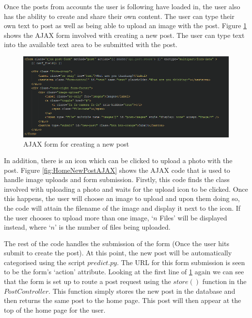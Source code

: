 Once the posts from accounts the user is following have loaded in, the user also has the ability to create and share their own content. The user can type their own text to post as well as being able to upload an image with the post. Figure \ref{fig:HomeNewPostForm} shows the AJAX form involved with creating a new post. The user can type text into the available text area to be submitted with the post.

\begin{figure}[H]
\centering
\includegraphics[width=\textwidth]{Images/Implementation/HomeNewPostForm}
\caption{AJAX form for creating a new post}
\label{fig:HomeNewPostForm}
\end{figure}

In addition, there is an icon which can be clicked to upload a photo with the post. Figure \ref{fig:HomeNewPostAJAX} shows the AJAX code that is used to handle image uploads and form submission. Firstly, this code finds the class involved with uploading a photo and waits for the upload icon to be clicked. Once this happens, the user will choose an image to upload and upon them doing so, the code will attain the filename of the image and display it next to the icon. If the user chooses to upload more than one image, `$n$ Files' will be displayed instead, where `$n$' is the number of files being uploaded.

The rest of the code handles the submission of the form (Once the user hits submit to create the post). At this point, the new post will be automatically categorised using the script $predict.py$. The URL for this form submission is seen to be the form's `action' attribute. Looking at the first line of \ref{fig:HomeNewPostForm} again we can see that the form is set up to route a post request using the $store()$ function in the $PostController$. This function simply stores the new post in the database and then returns the same post to the home page. This post will then appear at the top of the home page for the user.

